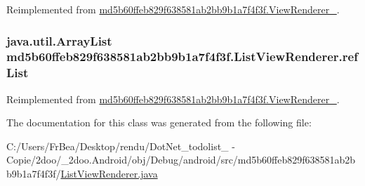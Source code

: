 Reimplemented from \hyperlink{classmd5b60ffeb829f638581ab2bb9b1a7f4f3f_1_1_view_renderer__2_80b609e3e4054c380887d4dc2907a875}{md5b60ffeb829f638581ab2bb9b1a7f4f3f.ViewRenderer\_}.\hypertarget{classmd5b60ffeb829f638581ab2bb9b1a7f4f3f_1_1_list_view_renderer_38328e716caa471f08bce0fc4af554aa}{
\subsubsection[{refList}]{\setlength{\rightskip}{0pt plus 5cm}java.util.ArrayList {\bf md5b60ffeb829f638581ab2bb9b1a7f4f3f.ListViewRenderer.refList}}}
\label{classmd5b60ffeb829f638581ab2bb9b1a7f4f3f_1_1_list_view_renderer_38328e716caa471f08bce0fc4af554aa}




Reimplemented from \hyperlink{classmd5b60ffeb829f638581ab2bb9b1a7f4f3f_1_1_view_renderer__2_6c151401977148a92c515e9c7de1aaf8}{md5b60ffeb829f638581ab2bb9b1a7f4f3f.ViewRenderer\_}.

The documentation for this class was generated from the following file:\begin{CompactItemize}
\item 
C:/Users/FrBea/Desktop/rendu/DotNet\_\-todolist\_ - Copie/2doo/\_\-2doo.Android/obj/Debug/android/src/md5b60ffeb829f638581ab2bb9b1a7f4f3f/\hyperlink{_list_view_renderer_8java}{ListViewRenderer.java}\end{CompactItemize}
